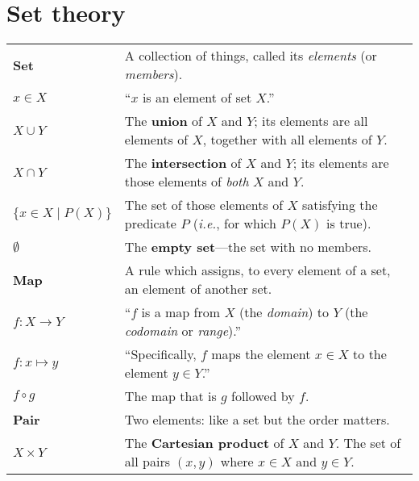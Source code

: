 \documentclass[10pt, a4paper, twocolumn]{article}
\newcommand{\defn}[1]{\textbf{\textsf{#1}}}
\begin{document}
\section{Set theory}
\begin{tabularx}{\columnwidth}{@{}p{}X@{}}
  \toprule
  \defn{Set} & A collection of things, called its \emph{elements} (or \emph{members}). \\

  $x \in X$    & ``$x$ is an element of set $X$.'' \\

  $X\cup Y$     & The \defn{union} of $X$ and $Y$; its elements are all
  elements of $X$, together with all elements of $Y$. \\

  $X\cap Y$     & The \defn{intersection} of $X$ and $Y$; its elements are
  those elements of \emph{both} $X$ and $Y$. \\

  $\{x\in X\mid P(X)\}$ & The set of those elements of $X$ satisfying the
  predicate $P$ (\textit{i.e.}, for which $P(X)$ is true). \\

  $\emptyset$        & The \defn{empty set}---the set with no members. \\
  \defn{Map} & A rule which assigns, to every element of a set, an element of
  another set. \\

  $f:X\to Y$   & ``$f$ is a map from $X$ (the \emph{domain}) to $Y$ (the
  \emph{codomain} or \emph{range}).'' \\

  $f:x \mapsto y$  & ``Specifically, $f$ maps the element $x \in X$ to the
  element $y \in Y$.'' \\
  $f \circ g$    & The map that is $g$ followed by $f$. \\

  \defn{Pair} & Two elements: like a set but the order matters. \\
  
  $X\times Y$      & The \defn{Cartesian product} of $X$ and $Y$. The set
  of all pairs $(x,y)$ where $x\in X$ and $y \in Y$. \\
\end{tabularx}
\end{document}
